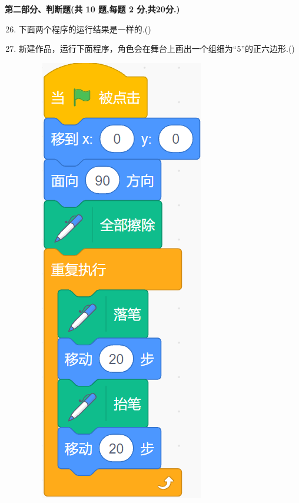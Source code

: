 \documentclass[10pt, a4paper]{article}
\begin{document}
    {\noindent\textbf{第二部分、判断题(共 10 题,每题 2 分,共20分.)}}
    \begin{enumerate}
        \setcounter{enumi}{25}
        \item 下面两个程序的运行结果是一样的.(\qquad)

        \item 新建作品，运行下面程序，角色会在舞台上画出一个组细为“5”的正六边形.(\qquad)
        
        \begin{figure}[htbp]
            \centering
            \begin{minipage}[t]{.11\textwidth}
                \centering
                \includegraphics[width=\textwidth]{25.png}

\end{minipage}
\end{figure}
\end{enumerate}
\end{document}
